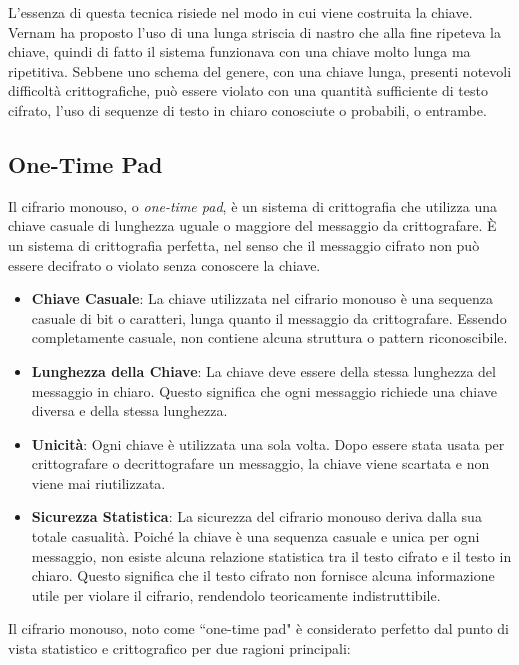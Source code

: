 L'essenza di questa tecnica risiede nel modo in cui viene costruita la chiave. Vernam 
ha proposto l'uso di una lunga striscia di nastro che alla fine ripeteva la chiave, quindi 
di fatto il sistema funzionava con una chiave molto lunga ma ripetitiva. Sebbene uno schema 
del genere, con una chiave lunga, presenti notevoli difficoltà crittografiche, può essere violato con
una quantità sufficiente di testo cifrato, l'uso di sequenze di testo in chiaro conosciute o probabili, o entrambe.
\subsection{One-Time Pad}
Il cifrario monouso, o \textit{one-time pad}, è un sistema di crittografia che utilizza una chiave
casuale di lunghezza uguale o maggiore del messaggio da crittografare. È un sistema di crittografia
perfetta, nel senso che il messaggio cifrato non può essere decifrato o violato senza conoscere la chiave.
\begin{itemize}
    \item \textbf{Chiave Casuale}: La chiave utilizzata nel cifrario monouso è una sequenza 
    casuale di bit o caratteri, lunga quanto il messaggio da crittografare. Essendo completamente casuale, 
    non contiene alcuna struttura o pattern riconoscibile.
    
    \item \textbf{Lunghezza della Chiave}: La chiave deve essere della stessa lunghezza del messaggio 
    in chiaro. Questo significa che ogni messaggio richiede una chiave diversa e della stessa lunghezza.
    
    \item \textbf{Unicità}: Ogni chiave è utilizzata una sola volta. Dopo essere stata usata per crittografare
    o decrittografare un messaggio, la chiave viene scartata e non viene mai riutilizzata.
    
    \item \textbf{Sicurezza Statistica}: La sicurezza del cifrario monouso deriva dalla sua totale casualità.
    Poiché la chiave è una sequenza casuale e unica per ogni messaggio, non esiste alcuna relazione statistica
    tra il testo cifrato e il testo in chiaro. Questo significa che il testo cifrato non fornisce alcuna
    informazione utile per violare il cifrario, rendendolo teoricamente indistruttibile.
\end{itemize}
Il cifrario monouso, noto come ``one-time pad" è considerato perfetto dal punto di vista statistico
e crittografico per due ragioni principali:

